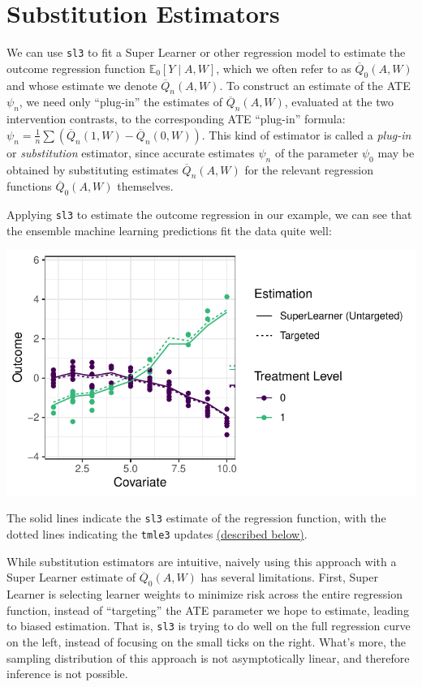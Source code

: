 \documentclass[12pt, krantz2,]{book}
\theoremstyle{definition}
\theoremstyle{definition}
\theoremstyle{definition}
\newcommand{\1}{\mathbbm{1}}
\begin{document}
\hypertarget{substitution-est}{%
\section{Substitution Estimators}\label{substitution-est}}

We can use \texttt{sl3} to fit a Super Learner or other regression model to estimate
the outcome regression function \(\mathbb{E}_0[Y \mid A,W]\), which we often refer
to as \(\overline{Q}_0(A,W)\) and whose estimate we denote \(\overline{Q}_n(A,W)\).
To construct an estimate of the ATE \(\psi_n\), we need only ``plug-in'' the
estimates of \(\overline{Q}_n(A,W)\), evaluated at the two intervention contrasts,
to the corresponding ATE ``plug-in'' formula:
\(\psi_n = \frac{1}{n}\sum(\overline{Q}_n(1,W)-\overline{Q}_n(0,W))\). This kind
of estimator is called a \emph{plug-in} or \emph{substitution} estimator, since accurate
estimates \(\psi_n\) of the parameter \(\psi_0\) may be obtained by substituting
estimates \(\overline{Q}_n(A,W)\) for the relevant regression functions
\(\overline{Q}_0(A,W)\) themselves.

Applying \texttt{sl3} to estimate the outcome regression in our example, we can see
that the ensemble machine learning predictions fit the data quite well:

\begin{center}\includegraphics[width=0.8\linewidth]{img/misc/tmle_sim/schematic_2b_sllik} \end{center}

The solid lines indicate the \texttt{sl3} estimate of the regression function, with the
dotted lines indicating the \texttt{tmle3} updates \protect\hyperlink{tmle-updates}{(described below)}.

While substitution estimators are intuitive, naively using this approach with a
Super Learner estimate of \(\overline{Q}_0(A,W)\) has several limitations. First,
Super Learner is selecting learner weights to minimize risk across the entire
regression function, instead of ``targeting'' the ATE parameter we hope to
estimate, leading to biased estimation. That is, \texttt{sl3} is trying to do well on
the full regression curve on the left, instead of focusing on the small ticks on
the right. What's more, the sampling distribution of this approach is not
asymptotically linear, and therefore inference is not possible.
\end{document}
